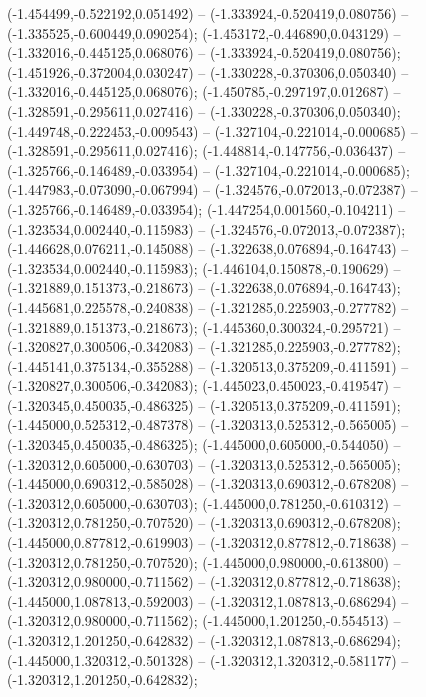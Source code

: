  (-1.454499,-0.522192,0.051492) -- (-1.333924,-0.520419,0.080756) -- (-1.335525,-0.600449,0.090254);
 (-1.453172,-0.446890,0.043129) -- (-1.332016,-0.445125,0.068076) -- (-1.333924,-0.520419,0.080756);
 (-1.451926,-0.372004,0.030247) -- (-1.330228,-0.370306,0.050340) -- (-1.332016,-0.445125,0.068076);
 (-1.450785,-0.297197,0.012687) -- (-1.328591,-0.295611,0.027416) -- (-1.330228,-0.370306,0.050340);
 (-1.449748,-0.222453,-0.009543) -- (-1.327104,-0.221014,-0.000685) -- (-1.328591,-0.295611,0.027416);
 (-1.448814,-0.147756,-0.036437) -- (-1.325766,-0.146489,-0.033954) -- (-1.327104,-0.221014,-0.000685);
 (-1.447983,-0.073090,-0.067994) -- (-1.324576,-0.072013,-0.072387) -- (-1.325766,-0.146489,-0.033954);
 (-1.447254,0.001560,-0.104211) -- (-1.323534,0.002440,-0.115983) -- (-1.324576,-0.072013,-0.072387);
 (-1.446628,0.076211,-0.145088) -- (-1.322638,0.076894,-0.164743) -- (-1.323534,0.002440,-0.115983);
 (-1.446104,0.150878,-0.190629) -- (-1.321889,0.151373,-0.218673) -- (-1.322638,0.076894,-0.164743);
 (-1.445681,0.225578,-0.240838) -- (-1.321285,0.225903,-0.277782) -- (-1.321889,0.151373,-0.218673);
 (-1.445360,0.300324,-0.295721) -- (-1.320827,0.300506,-0.342083) -- (-1.321285,0.225903,-0.277782);
 (-1.445141,0.375134,-0.355288) -- (-1.320513,0.375209,-0.411591) -- (-1.320827,0.300506,-0.342083);
 (-1.445023,0.450023,-0.419547) -- (-1.320345,0.450035,-0.486325) -- (-1.320513,0.375209,-0.411591);
 (-1.445000,0.525312,-0.487378) -- (-1.320313,0.525312,-0.565005) -- (-1.320345,0.450035,-0.486325);
 (-1.445000,0.605000,-0.544050) -- (-1.320312,0.605000,-0.630703) -- (-1.320313,0.525312,-0.565005);
 (-1.445000,0.690312,-0.585028) -- (-1.320313,0.690312,-0.678208) -- (-1.320312,0.605000,-0.630703);
 (-1.445000,0.781250,-0.610312) -- (-1.320312,0.781250,-0.707520) -- (-1.320313,0.690312,-0.678208);
 (-1.445000,0.877812,-0.619903) -- (-1.320312,0.877812,-0.718638) -- (-1.320312,0.781250,-0.707520);
 (-1.445000,0.980000,-0.613800) -- (-1.320312,0.980000,-0.711562) -- (-1.320312,0.877812,-0.718638);
 (-1.445000,1.087813,-0.592003) -- (-1.320312,1.087813,-0.686294) -- (-1.320312,0.980000,-0.711562);
 (-1.445000,1.201250,-0.554513) -- (-1.320312,1.201250,-0.642832) -- (-1.320312,1.087813,-0.686294);
 (-1.445000,1.320312,-0.501328) -- (-1.320312,1.320312,-0.581177) -- (-1.320312,1.201250,-0.642832);
